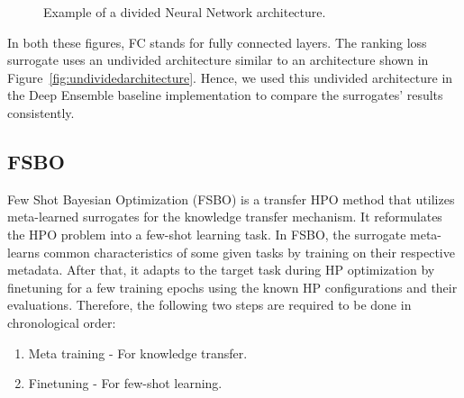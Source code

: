 \documentclass[12pt, twoside, ngerman]{report}
\begin{document}
\begin{figure}[H]
\centering
{}
\caption{Example of a divided Neural Network architecture.}
\label{fig:dividedarchitecture}
\end{figure}

In both these figures,  FC stands for fully connected layers.
The ranking loss surrogate uses an undivided architecture similar to an architecture shown in Figure~\ref{fig:undividedarchitecture}. Hence, we used this undivided architecture in the Deep Ensemble baseline implementation to compare the surrogates' results consistently.

\subsection{FSBO}
\label{sec:FSBOBackground}
Few Shot Bayesian Optimization (FSBO) is a transfer HPO method that utilizes meta-learned surrogates for the knowledge transfer mechanism.
It reformulates the HPO problem into a few-shot learning task.
In FSBO, the surrogate meta-learns common characteristics of some given tasks by training on their respective metadata. After that, it adapts to the target task during HP optimization by finetuning for a few training epochs using the known HP configurations and their evaluations.
Therefore, the following two steps are required to be done in chronological order:
\begin{enumerate}
\item Meta training - For knowledge transfer.
\item Finetuning - For few-shot learning.
\end{enumerate}
\end{document}
